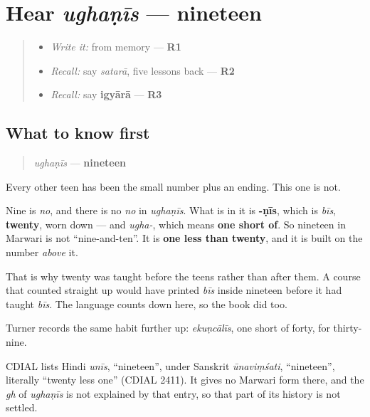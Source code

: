 \section[ughaṇīs]{Hear \emph{ughaṇīs} — nineteen}

\label{lesson:MW-C38-hear-ughanis}



\begin{quote}
\begin{itemize}
\raggedright
  \item \emph{Write it:} \textbf{} from memory — \textbf{R1}
  \item \emph{Recall:} say \emph{satarā}, five lessons back — \textbf{R2}
  \item \emph{Recall:} say \textbf{igyārā} — \textbf{R3}
\end{itemize}
\end{quote}

\subsection*{What to know first}
\begin{quote}
\emph{ughaṇīs} — \textbf{nineteen}
\end{quote}

Every other teen has been the small number plus an ending. This one is not.

Nine is \emph{no}, and there is no \emph{no} in \emph{ughaṇīs}. What is in it is \textbf{-ṇīs}, which is \emph{bīs}, \textbf{twenty}, worn down — and \emph{ugha-}, which means \textbf{one short of}. So nineteen in Marwari is not \textquotedblleft{}nine-and-ten\textquotedblright{}. It is \textbf{one less than twenty}, and it is built on the number \emph{above} it.

That is why twenty was taught before the teens rather than after them. A course that counted straight up would have printed \emph{bīs} inside nineteen before it had taught \emph{bīs}. The language counts down here, so the book did too.

Turner records the same habit further up: \emph{ekuṇcālīs}, one short of forty, for thirty-nine.

\begin{cousinweb}
CDIAL lists Hindi \emph{unīs}, \textquotedblleft{}nineteen\textquotedblright{}, under Sanskrit \emph{ūnaviṃśati}, \textquotedblleft{}nineteen\textquotedblright{}, literally \textquotedblleft{}twenty less one\textquotedblright{} (CDIAL 2411). It gives no Marwari form there, and the \emph{gh} of \emph{ughaṇīs} is not explained by that entry, so that part of its history is not settled.
\end{cousinweb}

